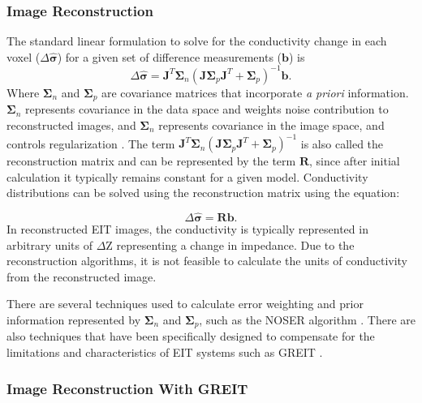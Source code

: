 \subsubsection{Image Reconstruction}
The standard linear formulation \parencite{holder_electrical_2004} 
to solve for the conductivity change in each 
voxel ($\Delta \mathbf{\hat{\sigma}}$) for a given set of difference measurements ($\mathbf{b}$) is
\begin{equation}
	\Delta \mathbf{\hat{\sigma}} = \mathbf{J}^T \mathbf{\Sigma}_n 
	(\mathbf{J} \mathbf{\Sigma}_p \mathbf{J}^T + \mathbf{\Sigma}_p)^{-1} \mathbf{b}. 
\end{equation}
Where $\mathbf{\Sigma}_n$ and $\mathbf{\Sigma}_p$ are covariance matrices that 
incorporate \emph{a priori} information. 
$\mathbf{\Sigma}_n$ represents covariance in the data space and weights noise 
contribution to reconstructed images, and
$\mathbf{\Sigma}_n$ represents covariance in the image space, and 
controls regularization \parencite{adler_electrical_1996}.
The term $ \mathbf{J}^T  \mathbf{\Sigma}_n
(\mathbf{J} \mathbf{\Sigma}_p \mathbf{J}^T + \mathbf{\Sigma}_p)^{-1} $ is also called the 
reconstruction matrix and can be represented by the term
$\mathbf{R}$, since after initial calculation it typically remains constant for a given model. 
Conductivity distributions can be solved using the reconstruction matrix using the equation:

\begin{equation} \label{eq:rm_solve}
	\Delta \mathbf{\hat{\sigma}} = \mathbf{R} \mathbf{b}. 
\end{equation}
In reconstructed EIT images, the conductivity is typically represented in arbitrary units 
of $\Delta \text{Z}$ representing a change in impedance. Due to the reconstruction algorithms, it is not
feasible to calculate the units of conductivity from the reconstructed image. 

There are several techniques used to calculate error weighting and prior information represented by 
$\mathbf{\Sigma}_n$ and $\mathbf{\Sigma}_p$,
such as the NOSER algorithm \parencite{cheney_noser_1990}. There are also 
techniques that have been specifically designed 
to compensate for the limitations and characteristics of EIT systems 
such as GREIT \parencite{adler_greit_2009}.

\subsubsection{Image Reconstruction With GREIT}

